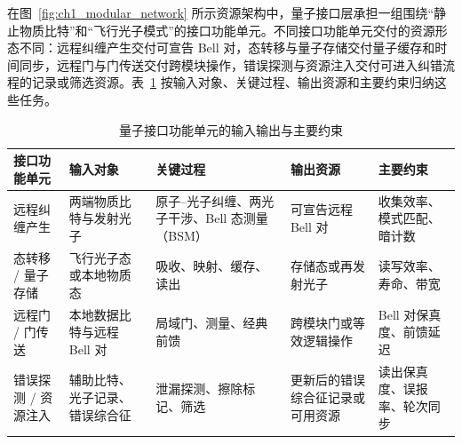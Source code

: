在图~\ref{fig:ch1_modular_network} 所示资源架构中，量子接口层承担一组围绕“静止物质比特”和“飞行光子模式”的接口功能单元。不同接口功能单元交付的资源形态不同：远程纠缠产生交付可宣告 Bell 对，态转移与量子存储交付量子缓存和时间同步，远程门与门传送交付跨模块操作，错误探测与资源注入交付可进入纠错流程的记录或筛选资源。表~\ref{tab:interface_primitives} 按输入对象、关键过程、输出资源和主要约束归纳这些任务。
\begin{table}[htbp]
\centering
\footnotesize
\renewcommand{\arraystretch}{1.25}
\caption{量子接口功能单元的输入输出与主要约束}
\label{tab:interface_primitives}
\begin{tabularx}{0.98\linewidth}{>{\raggedright\arraybackslash}p{2.2cm}>{\raggedright\arraybackslash}p{3.0cm}>{\raggedright\arraybackslash}p{3.5cm}>{\raggedright\arraybackslash}p{3.0cm}>{\raggedright\arraybackslash}X}
\toprule
接口功能单元 & 输入对象 & 关键过程 & 输出资源 & 主要约束 \\
\midrule
远程纠缠产生 & 两端物质比特与发射光子 & 原子--光子纠缠、两光子干涉、Bell 态测量（BSM） & 可宣告远程 Bell 对 & 收集效率、模式匹配、暗计数 \\
态转移 / 量子存储 & 飞行光子态或本地物质态 & 吸收、映射、缓存、读出 & 存储态或再发射光子 & 读写效率、寿命、带宽 \\
远程门 / 门传送 & 本地数据比特与远程 Bell 对 & 局域门、测量、经典前馈 & 跨模块门或等效逻辑操作 & Bell 对保真度、前馈延迟 \\
错误探测 / 资源注入 & 辅助比特、光子记录、错误综合征 & 泄漏探测、擦除标记、筛选 & 更新后的错误综合征记录或可用资源 & 读出保真度、误报率、轮次同步 \\
\bottomrule
\end{tabularx}
\end{table}



